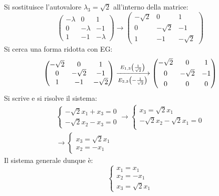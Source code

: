 \documentclass[a4paper]{article}
\makeatletter
\newenvironment{rowequmat}[1]{\left(\array{@{}#1@{}}}{\endarray\right)}
\makeatother
\begin{document}
	\noindent
	Si sostituisce l'autovalore $\lambda_{3} = \sqrt{2}$ all'interno della matrice:
	\begin{equation*}
		\begin{pmatrix}
			-\lambda & 0 & 1 \\
			0 & -\lambda & -1 \\
			1 & -1 & -\lambda
		\end{pmatrix}
		\longrightarrow
		\begin{pmatrix}
			-\sqrt{2} & 0 & 1 \\
			0 & -\sqrt{2} & -1 \\
			1 & -1 & -\sqrt{2}
		\end{pmatrix}
	\end{equation*}
	Si cerca una forma ridotta con EG:
	\begin{equation*}
		\begin{pmatrix}
			-\sqrt{2} & 0 & 1 \\
			0 & -\sqrt{2} & -1 \\
			1 & -1 & -\sqrt{2}
		\end{pmatrix}
		\xlongrightarrow[E_{2,3}\left(-\frac{1}{\sqrt{2}}\right)]{E_{1,3}\left(\frac{1}{\sqrt{2}}\right)}
		\begin{rowequmat}{ccc}
			-\sqrt{2} & 0 & 1 \\ [.3em]
			0 & -\sqrt{2} & -1 \\ [.3em]
			0 & 0 & 0
		\end{rowequmat}
	\end{equation*}
	Si scrive e si risolve il sistema:
	\begin{gather*}
		\begin{cases}
			-\sqrt{2}x_{1} + x_{3} = 0 \\
			-\sqrt{2}x_{2} - x_{3} = 0
		\end{cases}
		\longrightarrow
		\begin{cases}
			x_{3} = \sqrt{2}x_{1} \\
			-\sqrt{2}x_{2} - \sqrt{2}x_{1} = 0 \\
		\end{cases} \\
		\longrightarrow
		\begin{cases}
			x_{3} = \sqrt{2}x_{1} \\
			x_{2} = -x_{1}
		\end{cases}
	\end{gather*}
	Il sistema generale dunque è:
	\begin{equation*}
		\begin{cases}
			x_{1} = x_{1} \\
			x_{2} = -x_{1} \\
			x_{3} = \sqrt{2}x_{1}
		\end{cases}
	\end{equation*}
\end{document}
